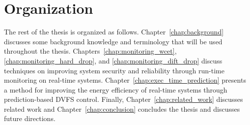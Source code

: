 \section{Organization}

The rest of the thesis is organized as follows.
Chapter~\ref{chap:background} discusses some background knowledge and
terminology that will be used throughout the thesis.
Chapters~\ref{chap:monitoring_wcet}, \ref{chap:monitoring_hard_drop}, and
\ref{chap:monitoring_dift_drop} discuss techniques on improving system security
and reliability through run-time monitoring on real-time systems.
Chapter~\ref{chap:exec_time_prediction} presents a method for improving the
energy efficiency of real-time systems through prediction-based DVFS control.
Finally, Chapter~\ref{chap:related_work} discusses related work and
Chapter~\ref{chap:conclusion} concludes the thesis and discusses future
directions.
